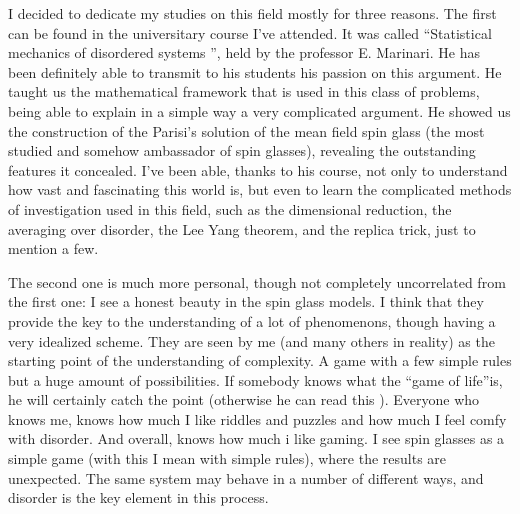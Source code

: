 I decided to dedicate my studies on this field mostly for three reasons. The first can be found in the universitary course I've attended. It was called \textquotedblleft Statistical mechanics of disordered systems \textquotedblright, held by the professor E. Marinari. He has been definitely able to transmit to his students his passion on this argument. He taught us the mathematical framework that is used in this class of problems, being able to explain in a simple way a very complicated argument. He showed us the construction of the Parisi's solution of the mean field spin glass (the most studied and somehow ambassador of spin glasses), revealing the outstanding features it concealed. I've been able, thanks to his course, not only to understand how vast and fascinating this world is, but even to learn the complicated methods of investigation used in this field, such as the dimensional reduction, the averaging over disorder, the Lee Yang theorem, and the replica trick, just to mention a few.

The second one is much more personal, though not completely uncorrelated from the first one: I see a honest beauty in the spin glass models. I think that they provide the key to the understanding of a lot of phenomenons, though having a very idealized scheme. They are seen by me (and many others in reality) as the starting point of the understanding of complexity. A game with a few simple rules but a huge amount of possibilities. If somebody knows what the \textquotedblleft game of life\textquotedblright is, he will certainly catch the point (otherwise he can read this \cite{life}).
Everyone who knows me, knows how much I like riddles and puzzles and how much I feel comfy with disorder. And overall, knows how much i like gaming.
I see spin glasses as a simple game (with this I mean with simple rules), where the results are unexpected. The same system may behave in a number of different ways, and disorder is the key element in this process.

